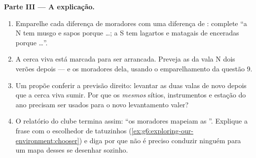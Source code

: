 \begin{problem}
\medskip\noindent\textbf{Parte III --- A explicação.}
\begin{enumerate}[resume]
  \item Emparelhe cada diferença de moradores com uma diferença de
        : complete ``a N tem musgo e sapos porque \dots; a S
        tem lagartos e matagais de  enceradas porque \dots''.
  \item A cerca viva está marcada para ser arrancada. Preveja as
         da vala N dois verões depois --- e os moradores
        dela, usando o emparelhamento da questão 9.
  \item Um  propõe conferir a previsão direito: levantar as
        duas valas de novo depois que a cerca viva sumir. Por que os
        \emph{mesmos} sítios, instrumentos e estação do ano precisam
        ser usados para o novo levantamento valer?
  \item O relatório do clube termina assim: ``os moradores mapeiam as
        ''. Explique a frase com o escolhedor de tatuzinhos
        (\cref{ex:g6:exploring-our-environment:chooser}) e diga por
        que não é preciso conduzir ninguém para um mapa desses se
        desenhar sozinho.
\end{enumerate}
\end{problem}
